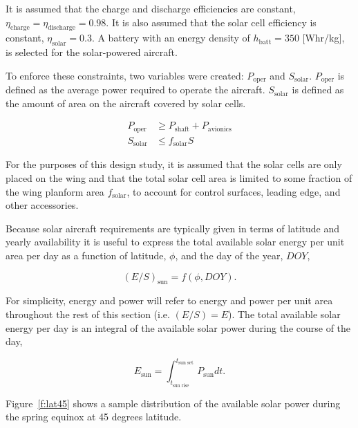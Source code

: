 \documentclass[]{aiaa-tc}%
\begin{document}
    It is assumed that the charge and discharge efficiencies are constant, $\eta_{\text{charge}} = \eta_{\text{discharge}} = 0.98$. 
    It is also assumed that the solar cell efficiency is constant, $\eta_{\text{solar}} = 0.3$. 
    A battery with an energy density of $h_{\text{batt}} = 350$ [Whr/kg], is selected for the solar-powered aircraft. 

    To enforce these constraints, two variables were created: $P_{\text{oper}}$ and $S_{\text{solar}}$. 
    $P_{\text{oper}}$ is defined as the average power required to operate the aircraft. 
    $S_{\text{solar}}$ is defined as the amount of area on the aircraft covered by solar cells. 

    \begin{align}
        \label{e:solarpoper}
        P_{\text{oper}} &\geq P_{\text{shaft}} + P_{\text{avionics}} \\
        \label{e:solarssolar}
        S_{\text{solar}} &\leq f_{\text{solar}}S
    \end{align}

    For the purposes of this design study, it is assumed that the solar cells are only placed on the wing and that the total solar cell area is limited to some fraction of the wing planform area $f_{\text{solar}}$, to account for control surfaces, leading edge, and other accessories.

    Because solar aircraft requirements are typically given in terms of latitude and yearly availability it is useful to express the total available solar energy per unit area per day as a function of latitude, $\phi$, and the day of the year, $DOY$, 
    
    \begin{equation}
        \label{e:solarfunc}
        (E/S)_{\text{sun}} = f(\phi, DOY).
    \end{equation}


    For simplicity, energy and power will refer to energy and power per unit area throughout the rest of this section (i.e. $(E/S) = E$). 
    The total available solar energy per day is an integral of the available solar power during the course of the day,

    \begin{equation}
        \label{e:solares}
        E_{\text{sun}} = \int_{t_{\text{sun rise}}}^{t_{\text{sun set}}} P_{\text{sun}} dt.
    \end{equation}

    Figure~\ref{f:lat45} shows a sample distribution of the available solar power during the spring equinox at 45 degrees latitude. 
    
\end{document}
